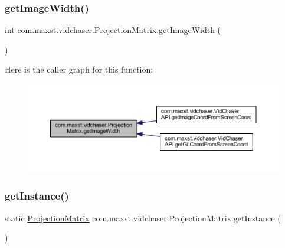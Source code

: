 \subsubsection{\texorpdfstring{get\+Image\+Width()}{getImageWidth()}}
{\footnotesize\ttfamily int com.\+maxst.\+vidchaser.\+Projection\+Matrix.\+get\+Image\+Width (\begin{DoxyParamCaption}{ }\end{DoxyParamCaption})}

Here is the caller graph for this function\+:\nopagebreak
\begin{figure}[H]
\begin{center}
\leavevmode
\includegraphics[width=350pt]{classcom_1_1maxst_1_1vidchaser_1_1_projection_matrix_a1e07354294afffdb44a61c7b7659e1fa_icgraph}
\end{center}
\end{figure}
\mbox{\label{classcom_1_1maxst_1_1vidchaser_1_1_projection_matrix_afb7c50dffd1d73e23680af04b5ba5a04}} 
\subsubsection{\texorpdfstring{get\+Instance()}{getInstance()}}
{\footnotesize\ttfamily static \hyperlink{classcom_1_1maxst_1_1vidchaser_1_1_projection_matrix}{Projection\+Matrix} com.\+maxst.\+vidchaser.\+Projection\+Matrix.\+get\+Instance (\begin{DoxyParamCaption}{ }\end{DoxyParamCaption})\hspace{0.3cm}{\ttfamily [static]}}

